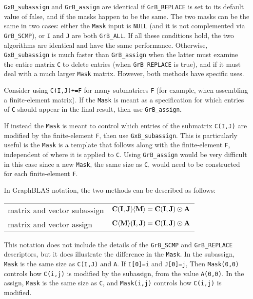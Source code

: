 \documentclass[12pt]{article}
\begin{document}
\verb'GxB_subassign' and \verb'GrB_assign' are identical if \verb'GrB_REPLACE'
is set to its default value of false, and if the masks happen to be the same.
The two masks can be the same in two cases:  either the \verb'Mask' input is
\verb'NULL' (and it is not complemented via \verb'GrB_SCMP'), or \verb'I' and
\verb'J' are both \verb'GrB_ALL'.
If all these conditions hold,
the two algorithms are identical and have the same performance.  Otherwise,
\verb'GxB_subassign' is much faster than \verb'GrB_assign' when the latter
must examine the entire matrix \verb'C' to delete entries (when
\verb'GrB_REPLACE' is true), and if it must deal with a much larger \verb'Mask'
matrix.  However, both methods have specific uses.

Consider using \verb'C(I,J)+=F' for many submatrices \verb'F' (for example,
when assembling a finite-element matrix).  If the \verb'Mask' is meant as a
specification for which entries of \verb'C' should appear in the final result,
then use \verb'GrB_assign'.

If instead the \verb'Mask' is meant to control which entries of the submatrix
\verb'C(I,J)' are modified by the finite-element \verb'F', then use
\verb'GxB_subassign'.  This is particularly useful is the \verb'Mask' is a
template that follows along with the finite-element \verb'F', independent of
where it is applied to \verb'C'.  Using \verb'GrB_assign' would be very
difficult in this case since a new \verb'Mask', the same size as \verb'C',
would need to be constructed for each finite-element \verb'F'.

In GraphBLAS notation, the two methods can be described as follows:

\vspace{0.05in}
\begin{tabular}{ll}
\hline
matrix and vector subassign & ${\bf C(I,J) \langle M \rangle}  = {\bf C(I,J)} \odot {\bf A}$ \\
matrix and vector    assign & ${\bf C \langle M \rangle (I,J)} = {\bf C(I,J)} \odot {\bf A}$ \\
\hline
\end{tabular}
\vspace{0.05in}

This notation does not include the details of the \verb'GrB_SCMP' and
\verb'GrB_REPLACE' descriptors, but it does illustrate the difference in the
\verb'Mask'.  In the subassign, \verb'Mask' is the same size as \verb'C(I,J)'
and \verb'A'.  If \verb'I[0]=i' and \verb'J[0]=j', Then \verb'Mask(0,0)'
controls how \verb'C(i,j)' is modified by the subassign, from the value
\verb'A(0,0)'.  In the assign, \verb'Mask' is the same size as \verb'C', and
\verb'Mask(i,j)' controls how \verb'C(i,j)' is modified.
\end{document}
